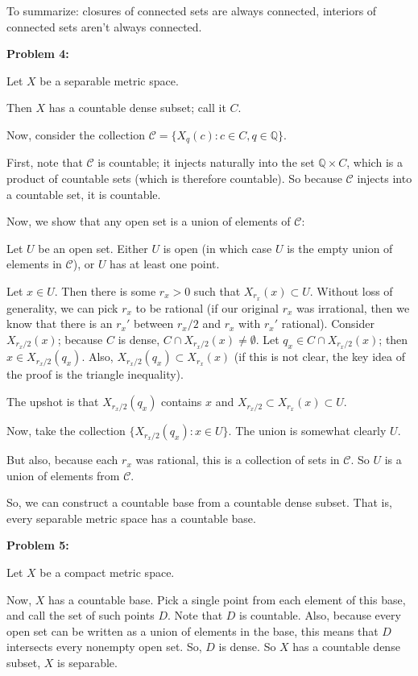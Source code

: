 \documentclass[a4paper,12pt]{article}
\newcommand{\tab}{\hspace{4mm}} %
\newcommand{\shunt}{\vspace{20mm}}
\newcommand{\Q}{\mathbb{Q}}
\newcommand{\scrC}{\mathcal{C}}
\begin{document}
To summarize: closures of connected sets are always connected, interiors of connected sets aren't always connected.

\shunt

{\bf Problem 4:}

Let $X$ be a separable metric space.

Then $X$ has a countable dense subset; call it $C$.

Now, consider the collection $\scrC = \{X_q(c): c \in C, q \in \Q\}$.

First, note that $\scrC$ is countable; it injects naturally into the set $\Q \times C$, which is a product of countable sets (which is therefore countable). So because $\scrC$ injects into a countable set, it is countable.

Now, we show that any open set is a union of elements of $\scrC$:

\tab Let $U$ be an open set. Either $U$ is open (in which case $U$ is the empty union of elements in $\scrC$), or $U$ has at least one point.

\tab Let $x \in U$. Then there is some $r_x>0$ such that $X_{r_x}(x) \subset U$. Without loss of generality, we can pick $r_x$ to be rational (if our original $r_x$ was irrational, then we know that there is an $r_x'$ between $r_x/2$ and $r_x$ with $r_x'$ rational). Consider $X_{r_x/2}(x)$; because $C$ is dense, $C \cap X_{r_x/2}(x) \neq \emptyset$. Let $q_x \in C \cap X_{r_x/2}(x)$; then $x \in X_{r_x/2}(q_x)$. Also, $X_{r_x/2}(q_x) \subset X_{r_x}(x)$ (if this is not clear, the key idea of the proof is the triangle inequality).

\tab The upshot is that $X_{r_x/2}(q_x)$ contains $x$ and $X_{r_x/2} \subset X_{r_x}(x) \subset U$.

\tab Now, take the collection $\{X_{r_x/2}(q_x): x \in U\}$. The union is somewhat clearly $U$. 

\tab But also, because each $r_x$ was rational, this is a collection of sets in $\scrC$. So $U$ is a union of elements from $\scrC$.

So, we can construct a countable base from a countable dense subset. That is, every separable metric space has a countable base.

\shunt

{\bf Problem 5:}

Let $X$ be a compact metric space.


Now, $X$ has a countable base. Pick a single point from each element of this base, and call the set of such points $D$. Note that $D$ is countable. Also, because every open set can be written as a union of elements in the base, this means that $D$ intersects every nonempty open set. So, $D$ is dense. So $X$ has a countable dense subset, $X$ is separable. 
\end{document}
